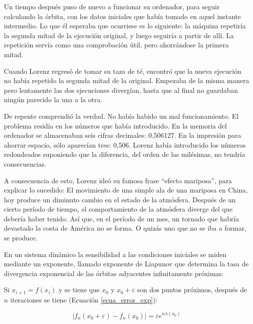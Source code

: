 \documentclass[letterpaper, 11pt, oneside]{article}
\theoremstyle{definition}
\theoremstyle{remark}
\begin{document}
\begin{itemize}
Un tiempo después puso de nuevo a funcionar su ordenador, para seguir calculando la órbita, con los datos iniciales que había tomado en aquel instante intermedio. Lo que él esperaba que ocurriese es lo siguiente: la máquina repetiría la segunda mitad de la ejecución original, y luego seguiría a partir de allí. La repetición servía como una comprobación útil, pero ahorrándose la primera mitad.

Cuando Lorenz regresó de tomar su taza de té, encontró que la nueva ejecución no había repetido la segunda mitad de la original. Empezaba de la misma manera pero lentamente las dos ejecuciones divergían, hasta que al final no guardaban ningún parecido la una a la otra.


De repente comprendió la verdad. No había habido un mal funcionamiento. El problema residía en los números que había introducido. En la memoria del ordenador se almacenaban seis cifras decimales: 0,506127. En la impresión para ahorrar espacio, sólo aparecían tres: 0,506. Lorenz había introducido los números redondeados suponiendo que la diferencia, del orden de las milésimas, no tendría consecuencias.

A consecuencia de esto, Lorenz ideó su famosa frase “efecto mariposa”, para explicar lo sucedido: El movimiento de una simple ala de una mariposa en China, hoy produce un diminuto cambio en el estado de la atmósfera. Después de un cierto período de tiempo, el comportamiento de la atmósfera diverge del que debería haber tenido. Así que, en el período de un mes, un tornado que habría devastado la costa de América no se forma. O quizás uno que no se iba a formar, se produce.

En un sistema dinámico la sensibilidad a las condiciones iniciales se miden mediante un exponente, llamado exponente de Liapunov que determina la tasa de divergencia exponencial de las órbitas adyacentes infinitamente próximas:

Si $x_{i+1} = f(x_i)$ y se tiene que $x_0$ y $x_0 + \varepsilon$ son dos puntos próximos, después de $n$ iteraciones se tiene (Ecuación \ref{ecua_error_exp}):

\begin{equation}
	\lvert f_n (x_0 +\varepsilon ) - f_n (x_0) \rvert = \varepsilon  e^{n \lambda ( x_0 )}
	\label{ecua_error_exp}
\end{equation}


\end{itemize}
\end{document}
